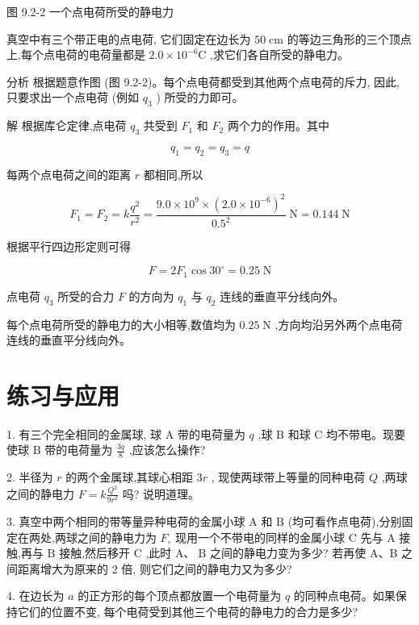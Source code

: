 \documentclass[10pt]{article}
\begin{document}
图 9.2-2 一个点电荷所受的静电力

真空中有三个带正电的点电荷, 它们固定在边长为 \({50}\mathrm{\;{cm}}\) 的等边三角形的三个顶点上,每个点电荷的电荷量都是 \({2.0} \times {10}^{-6}\mathrm{C}\) ,求它们各自所受的静电力。

分析 根据题意作图 (图 9.2-2)。每个点电荷都受到其他两个点电荷的斥力, 因此, 只要求出一个点电荷 (例如 \({q}_{3}\) ) 所受的力即可。

解 根据库仑定律,点电荷 \({q}_{3}\) 共受到 \({F}_{1}\) 和 \({F}_{2}\) 两个力的作用。其中

\[
{q}_{1} = {q}_{2} = {q}_{3} = q
\]

每两个点电荷之间的距离 \(r\) 都相同,所以

\[
{F}_{1} = {F}_{2} = k\frac{{q}^{2}}{{r}^{2}} = \frac{{9.0} \times {10}^{9} \times {\left( {2.0} \times {10}^{-6}\right) }^{2}}{{0.5}^{2}}\mathrm{\;N} = {0.144}\mathrm{\;N}
\]

根据平行四边形定则可得

\[
F = 2{F}_{1}\cos {30}^{ \circ } = {0.25}\mathrm{\;N}
\]

点电荷 \({q}_{3}\) 所受的合力 \(F\) 的方向为 \({q}_{1}\) 与 \({q}_{2}\) 连线的垂直平分线向外。

每个点电荷所受的静电力的大小相等,数值均为 \({0.25}\mathrm{\;N}\) ,方向均沿另外两个点电荷连线的垂直平分线向外。

\section*{练习与应用}

1. 有三个完全相同的金属球, 球 A 带的电荷量为 \(q\) ,球 \(\mathrm{B}\) 和球 \(\mathrm{C}\) 均不带电。现要使球 \(\mathrm{B}\) 带的电荷量为 \(\frac{3q}{8}\) ,应该怎么操作?

2. 半径为 \(r\) 的两个金属球,其球心相距 \({3r}\) , 现使两球带上等量的同种电荷 \(Q\) ,两球之间的静电力 \(F = k\frac{{Q}^{2}}{9{r}^{2}}\) 吗? 说明道理。

3. 真空中两个相同的带等量异种电荷的金属小球 \(\mathrm{A}\) 和 \(\mathrm{B}\) (均可看作点电荷),分别固定在两处,两球之间的静电力为 \({F}_{ \circ }\) 现用一个不带电的同样的金属小球 \(\mathrm{C}\) 先与 \(\mathrm{A}\) 接触,再与 \(\mathrm{B}\) 接触,然后移开 \(\mathrm{C}\) ,此时 \(\mathrm{A}\text{、}\mathrm{\;B}\) 之间的静电力变为多少? 若再使 A、B 之间距离增大为原来的 2 倍, 则它们之间的静电力又为多少?

4. 在边长为 \(a\) 的正方形的每个顶点都放置一个电荷量为 \(q\) 的同种点电荷。如果保持它们的位置不变, 每个电荷受到其他三个电荷的静电力的合力是多少?
\end{document}
